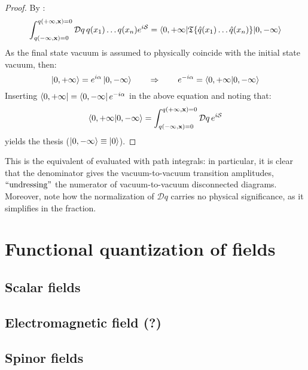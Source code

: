 \begin{proofbox}
  \begin{proof}
    By :
    \begin{equation*}
      \int_{q(-\infty,\mathbf{x}) = 0}^{q(+\infty,\mathbf{x}) = 0} \mathcal{D}q\, q(x_1) \dots q(x_n) e^{i\mathcal{S}} = \braket{0,+\infty | \mathfrak{T}\{\hat{q}(x_1) \dots \hat{q}(x_n)\} | 0,-\infty}
    \end{equation*}
    As the final state vacuum is assumed to physically coincide with the initial state vacuum, then:
    \begin{equation*}
      \ket{0,+\infty} = e^{i\alpha} \ket{0,-\infty}
      \qquad \Rightarrow \qquad
      e^{-i\alpha} = \braket{0,+\infty | 0,-\infty}
    \end{equation*}
    Inserting $ \bra{0,+\infty} = \bra{0,-\infty} e^{-i\alpha} $ in the above equation and noting that:
    \begin{equation}
      \braket{0,+\infty | 0,-\infty} = \int_{q(-\infty,\mathbf{x}) = 0}^{q(+\infty,\mathbf{x}) = 0} \mathcal{D}q\, e^{i\mathcal{S}}
      \label{eq:vac-to-vac}
    \end{equation}
  yields the thesis ($ \ket{0,-\infty} \equiv \ket{0} $).
  \end{proof}
\end{proofbox}

This is the equivalent of  evaluated with path integrals: in particular, it is clear that the denominator  gives the vacuum-to-vacuum transition amplitudes, $ ``\text{undressing}" $ the numerator of vacuum-to-vacuum disconnected diagrams. Moreover, note how the normalization of $ \mathcal{D}q $ carries no physical significance, as it simplifies in the fraction.

\section{Functional quantization of fields}

\subsection{Scalar fields}

\subsection{Electromagnetic field (?)}

\subsection{Spinor fields}










